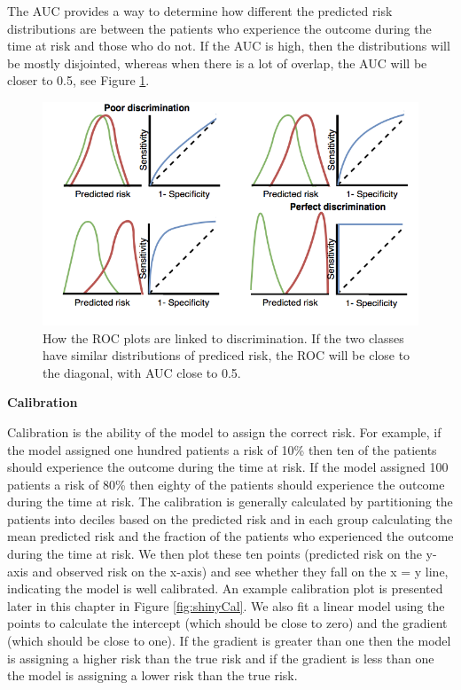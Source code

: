 \documentclass[11pt]{book}
\theoremstyle{definition}
\theoremstyle{definition}
\theoremstyle{definition}
\theoremstyle{remark}
\begin{document}
The AUC provides a way to determine how different the predicted risk distributions are between the patients who experience the outcome during the time at risk and those who do not. If the AUC is high, then the distributions will be mostly disjointed, whereas when there is a lot of overlap, the AUC will be closer to 0.5, see Figure \ref{fig:figuretheoryroctheory}.

\begin{figure}
\includegraphics[width=1\linewidth]{images/PatientLevelPrediction/theory/roctheory} \caption{How the ROC plots are linked to discrimination. If the two classes have similar distributions of prediced risk, the ROC will be close to the diagonal, with AUC close to 0.5.}\label{fig:figuretheoryroctheory}
\end{figure}

\textbf{Calibration}

Calibration is the ability of the model to assign the correct risk. For example, if the model assigned one hundred patients a risk of 10\% then ten of the patients should experience the outcome during the time at risk. If the model assigned 100 patients a risk of 80\% then eighty of the patients should experience the outcome during the time at risk. The calibration is generally calculated by partitioning the patients into deciles based on the predicted risk and in each group calculating the mean predicted risk and the fraction of the patients who experienced the outcome during the time at risk. We then plot these ten points (predicted risk on the y-axis and observed risk on the x-axis) and see whether they fall on the x = y line, indicating the model is well calibrated. An example calibration plot is presented later in this chapter in Figure \ref{fig:shinyCal}. We also fit a linear model using the points to calculate the intercept (which should be close to zero) and the gradient (which should be close to one). If the gradient is greater than one then the model is assigning a higher risk than the true risk and if the gradient is less than one the model is assigning a lower risk than the true risk. 
\end{document}
